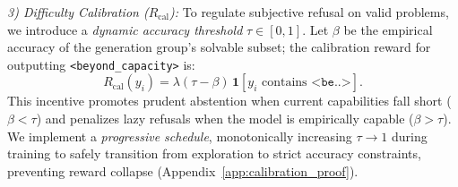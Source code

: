 \textit{3) Difficulty Calibration ($R_{\text{cal}}$):} To regulate subjective refusal on valid problems, we introduce a \textit{dynamic accuracy threshold} $\tau \in [0,1]$. Let $\beta$ be the empirical accuracy of the generation group's solvable subset; the calibration reward for outputting \texttt{<beyond\_capacity>} is:
\begin{equation}
\label{eg_dydc}
 R_{\text{cal}}(y_i) = \lambda (\tau - \beta)\,\mathbf{1}[y_i \text{ contains } \texttt{<be..>}].
\end{equation}
This incentive promotes prudent abstention when current capabilities fall short ($\beta < \tau$) and penalizes lazy refusals when the model is empirically capable ($\beta > \tau$). We implement a \textit{progressive schedule}, monotonically increasing $\tau \to 1$ during training to safely transition from exploration to strict accuracy constraints, preventing reward collapse (Appendix~\ref{app:calibration_proof}).
